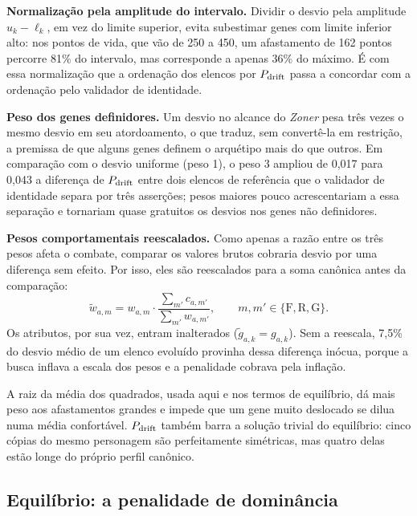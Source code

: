 \textbf{Normalização pela amplitude do intervalo.} Dividir o desvio pela amplitude $u_k - \ell_k$, em vez do limite superior, evita subestimar genes com limite inferior alto: nos pontos de vida, que vão de 250 a 450, um afastamento de 162 pontos percorre 81\% do intervalo, mas corresponde a apenas 36\% do máximo. É com essa normalização que a ordenação dos elencos por $P_{\mathrm{drift}}$ passa a concordar com a ordenação pelo validador de identidade.

\textbf{Peso dos genes definidores.} Um desvio no alcance do \textit{Zoner} pesa três vezes o mesmo desvio em seu atordoamento, o que traduz, sem convertê-la em restrição, a premissa de que alguns genes definem o arquétipo mais do que outros. Em comparação com o desvio uniforme (peso 1), o peso 3 ampliou de 0,017 para 0,043 a diferença de $P_{\mathrm{drift}}$ entre dois elencos de referência que o validador de identidade separa por três asserções; pesos maiores pouco acrescentariam a essa separação e tornariam quase gratuitos os desvios nos genes não definidores.

\textbf{Pesos comportamentais reescalados.} Como apenas a razão entre os três pesos afeta o combate, comparar os valores brutos cobraria desvio por uma diferença sem efeito. Por isso, eles são reescalados para a soma canônica antes da comparação:
\begin{equation}
    \label{eq: reescala}
    \tilde{w}_{a,m} = w_{a,m} \cdot \frac{\sum_{m'} c_{a,m'}}{\sum_{m'} w_{a,m'}}, \qquad m, m' \in \{\mathrm{F}, \mathrm{R}, \mathrm{G}\}.
\end{equation}
Os atributos, por sua vez, entram inalterados ($\tilde{g}_{a,k} = g_{a,k}$). Sem a reescala, 7,5\% do desvio médio de um elenco evoluído provinha dessa diferença inócua, porque a busca inflava a escala dos pesos e a penalidade cobrava pela inflação.

A raiz da média dos quadrados, usada aqui e nos termos de equilíbrio, dá mais peso aos afastamentos grandes e impede que um gene muito deslocado se dilua numa média confortável. $P_{\mathrm{drift}}$ também barra a solução trivial do equilíbrio: cinco cópias do mesmo personagem são perfeitamente simétricas, mas quatro delas estão longe do próprio perfil canônico.

\subsection{Equilíbrio: a penalidade de dominância}
\label{sub: dominancia}

